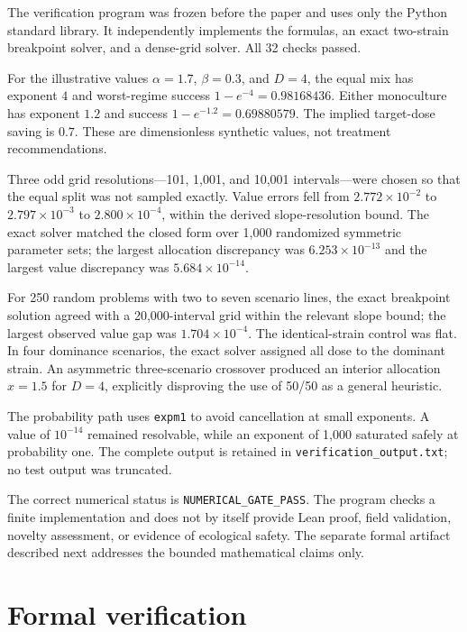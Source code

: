 \documentclass[10pt,twocolumn]{article}
\begin{document}
The verification program was frozen before the paper and uses only the Python
standard library. It independently implements the formulas, an exact
two-strain breakpoint solver, and a dense-grid solver. All 32 checks passed.

For the illustrative values $\alpha=1.7$, $\beta=0.3$, and $D=4$, the equal
mix has exponent $4$ and worst-regime success
$1-e^{-4}=0.98168436$. Either monoculture has exponent $1.2$ and success
$1-e^{-1.2}=0.69880579$. The implied target-dose saving is $0.7$. These are
dimensionless synthetic values, not treatment recommendations.

Three odd grid resolutions---101, 1,001, and 10,001 intervals---were chosen so
that the equal split was not sampled exactly. Value errors fell from
$2.772\times10^{-2}$ to $2.797\times10^{-3}$ to
$2.800\times10^{-4}$, within the derived slope-resolution bound. The exact
solver matched the closed form over 1,000 randomized symmetric parameter sets;
the largest allocation discrepancy was $6.253\times10^{-13}$ and the largest
value discrepancy was $5.684\times10^{-14}$.

For 250 random problems with two to seven scenario lines, the exact breakpoint
solution agreed with a 20,000-interval grid within the relevant slope bound;
the largest observed value gap was $1.704\times10^{-4}$. The identical-strain
control was flat. In four dominance scenarios, the exact solver assigned all
dose to the dominant strain. An asymmetric three-scenario crossover produced
an interior allocation $x=1.5$ for $D=4$, explicitly disproving the use of
50/50 as a general heuristic.

The probability path uses \texttt{expm1} to avoid cancellation at small
exponents. A value of $10^{-14}$ remained resolvable, while an exponent of
1,000 saturated safely at probability one. The complete output is retained in
\texttt{verification\_output.txt}; no test output was truncated.

The correct numerical status is \texttt{NUMERICAL\_GATE\_PASS}. The program
checks a finite implementation and does not by itself provide Lean proof,
field validation, novelty assessment, or evidence of ecological safety. The
separate formal artifact described next addresses the bounded mathematical
claims only.

\section{Formal verification}
\end{document}

